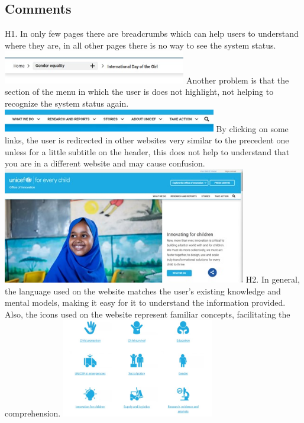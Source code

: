 \endgroup


\clearpage

\subsection*{Comments}
H1.	In only few pages there are breadcrumbs which can help users to understand where they are, in all other pages there is no way to see the system status.
\newline \includegraphics[width=0.6\textwidth]{FinalScores1.jpg}
\newline Another problem is that the section of the menu in which the user is does not highlight, not helping to recognize the system status again.
\newline \includegraphics[width=0.7\textwidth]{FinalScores2.jpg}
\newline By clicking on some links, the user is redirected in other websites very similar to the precedent one unless for a little subtitle on the header, this does not help to understand that you are in a different website and may cause confusion.
\newline \includegraphics[width=0.8\textwidth]{FinalScores3.jpg}
\newline
\newline H2.	In general, the language used on the website matches the user’s existing knowledge and mental models, making it easy for it to understand the information provided. Also, the icons used on the website represent familiar concepts, facilitating the comprehension.
\newline \includegraphics[width=0.5\textwidth]{FinalScores4.jpg}
